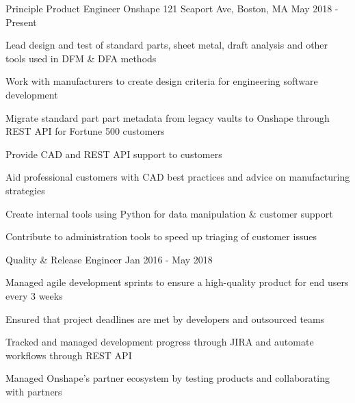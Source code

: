 

\begin{cventries}

  \cventry
    {Principle Product Engineer} %
    {Onshape} %
    {121 Seaport Ave, Boston, MA} %
    {May 2018 - Present} %
    {
      \begin{cvitems} %
        \item {Lead design and test of standard parts, sheet metal, draft analysis and other tools used in DFM \& DFA methods}
        \item {Work with manufacturers to create design criteria for engineering software development}
        \item {Migrate standard part part metadata from legacy vaults to Onshape through REST API for Fortune 500 customers}
        \item {Provide CAD and REST API support to customers}
        \item {Aid professional customers with CAD best practices and advice on manufacturing strategies}
        \item {Create internal tools using Python for data manipulation \& customer support}
        \item {Contribute to administration tools to speed up triaging of customer issues}
      \end{cvitems}
    }

  \cventry
    {Quality \& Release Engineer} %
    {} %
    {} %
    {Jan 2016 - May 2018} %
    {
      \begin{cvitems} %
        \item {Managed agile development sprints to ensure a high-quality product for end users every 3 weeks}
        \item {Ensured that project deadlines are met by developers and outsourced teams}
        \item {Tracked and managed development progress through JIRA and automate workflows through REST API}
        \item {Managed Onshape’s partner ecosystem by testing products and collaborating with partners}
      \end{cvitems}
    }


\end{cventries}
